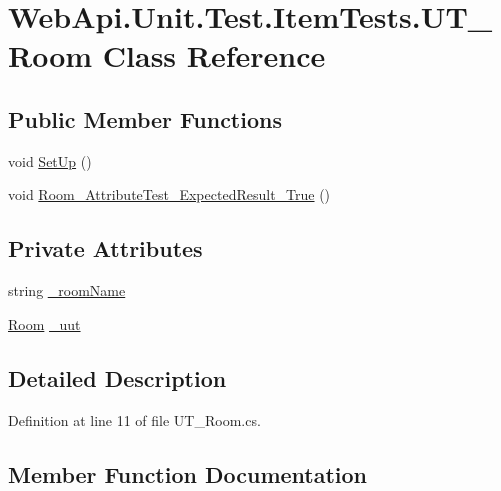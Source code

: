 \hypertarget{class_web_api_1_1_unit_1_1_test_1_1_item_tests_1_1_u_t___room}{}\section{Web\+Api.\+Unit.\+Test.\+Item\+Tests.\+U\+T\+\_\+\+Room Class Reference}
\label{class_web_api_1_1_unit_1_1_test_1_1_item_tests_1_1_u_t___room}
\subsection*{Public Member Functions}
\begin{DoxyCompactItemize}
\item 
void \mbox{\hyperlink{class_web_api_1_1_unit_1_1_test_1_1_item_tests_1_1_u_t___room_a6167e2c68c794ca8f7e700c88bd2cb49}{Set\+Up}} ()
\item 
void \mbox{\hyperlink{class_web_api_1_1_unit_1_1_test_1_1_item_tests_1_1_u_t___room_a92d5db4c122e88c9ba0dea34437e2aea}{Room\+\_\+\+Attribute\+Test\+\_\+\+Expected\+Result\+\_\+\+True}} ()
\end{DoxyCompactItemize}
\subsection*{Private Attributes}
\begin{DoxyCompactItemize}
\item 
string \mbox{\hyperlink{class_web_api_1_1_unit_1_1_test_1_1_item_tests_1_1_u_t___room_a9da70c78e56e8c25717cd407e480f7cc}{\+\_\+room\+Name}}
\item 
\mbox{\hyperlink{class_f_w_p_s_1_1_models_1_1_room}{Room}} \mbox{\hyperlink{class_web_api_1_1_unit_1_1_test_1_1_item_tests_1_1_u_t___room_a025e55bd7f700e0e81ae1d9dc631af42}{\+\_\+uut}}
\end{DoxyCompactItemize}


\subsection{Detailed Description}


Definition at line 11 of file U\+T\+\_\+\+Room.\+cs.



\subsection{Member Function Documentation}
\mbox{\label{class_web_api_1_1_unit_1_1_test_1_1_item_tests_1_1_u_t___room_a92d5db4c122e88c9ba0dea34437e2aea}} 
